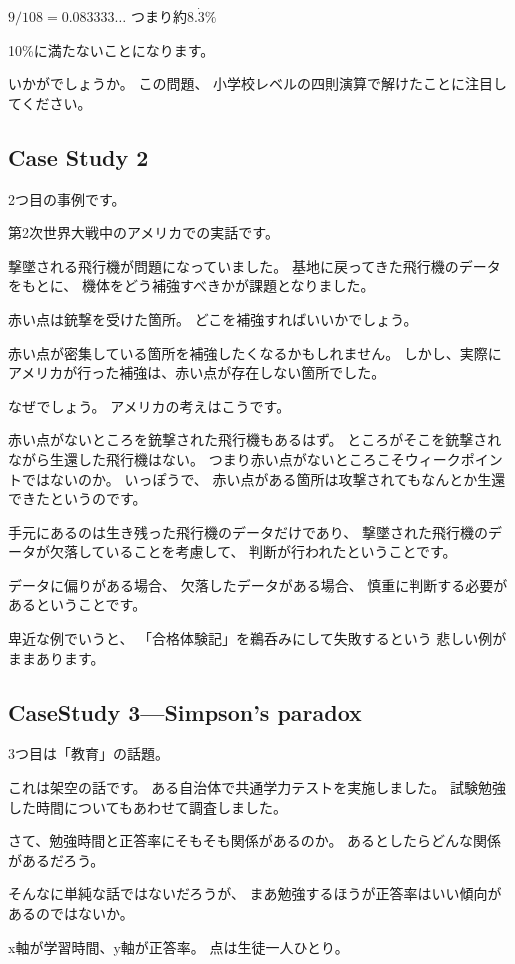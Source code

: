\documentclass[uplatex,jis2004,dvipdfmx,14pt]{jsarticle}
\begin{document}
$9/108=0.083333\dots$
つまり約$8.\dot{3}\%$

10\%に満たないことになります。

いかがでしょうか。
この問題、
小学校レベルの四則演算で解けたことに注目してください。

\newpage
\subsection{Case Study 2}

2つ目の事例です。

第2次世界大戦中のアメリカでの実話です。


撃墜される飛行機が問題になっていました。
基地に戻ってきた飛行機のデータをもとに、
機体をどう補強すべきかが課題となりました。

赤い点は銃撃を受けた箇所。
どこを補強すればいいかでしょう。

赤い点が密集している箇所を補強したくなるかもしれません。
しかし、実際にアメリカが行った補強は、赤い点が存在しない箇所でした。


なぜでしょう。
アメリカの考えはこうです。


赤い点がないところを銃撃された飛行機もあるはず。
ところがそこを銃撃されながら生還した飛行機はない。
つまり赤い点がないところこそウィークポイントではないのか。
いっぽうで、
赤い点がある箇所は攻撃されてもなんとか生還できたというのです。

手元にあるのは生き残った飛行機のデータだけであり、
撃墜された飛行機のデータが欠落していることを考慮して、
判断が行われたということです。

データに偏りがある場合、
欠落したデータがある場合、
慎重に判断する必要があるということです。

卑近な例でいうと、
「合格体験記」を鵜呑みにして失敗するという
悲しい例がままあります。

\newpage
\subsection{CaseStudy 3---Simpson's paradox}
3つ目は「教育」の話題。

これは架空の話です。
ある自治体で共通学力テストを実施しました。
試験勉強した時間についてもあわせて調査しました。


さて、勉強時間と正答率にそもそも関係があるのか。
あるとしたらどんな関係があるだろう。

そんなに単純な話ではないだろうが、
まあ勉強するほうが正答率はいい傾向があるのではないか。


x軸が学習時間、y軸が正答率。
点は生徒一人ひとり。
\end{document}
